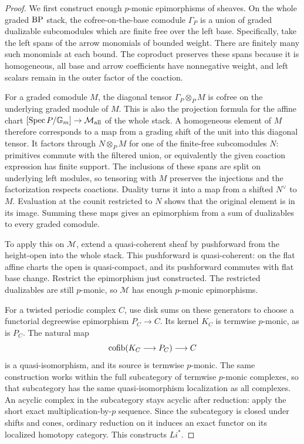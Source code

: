 \begin{proof}
We first construct enough $p$-monic epimorphisms of sheaves. On the
whole graded $\mathrm{BP}$ stack, the cofree-on-the-base comodule $\Gamma_P$
is a union of graded dualizable subcomodules which are finite free over
the left base. Specifically, take the left spans of the arrow monomials
of bounded weight. There are finitely many such monomials at each
bound. The coproduct preserves these spans because it is homogeneous,
all base and arrow coefficients have nonnegative weight, and left
scalars remain in the outer factor of the coaction.

For a graded comodule $M$, the diagonal tensor $\Gamma_P\otimes_PM$
is cofree on the underlying graded module of $M$. This is also the
projection formula for the affine chart
$[\operatorname{Spec} P/\mathbb G_m]\to\mathcal M_{\rm all}$ of the whole stack.
A homogeneous element of $M$ therefore corresponds to a map from a
grading shift of the unit into this diagonal tensor. It factors through
$N\otimes_PM$ for one of the finite-free subcomodules $N$:
primitives commute with the filtered union, or equivalently the given
coaction expression has finite support. The inclusions of these spans
are split on underlying left modules, so tensoring with $M$ preserves
the injections and the factorization respects coactions. Duality turns
it into a map from a shifted $N^\vee$ to $M$. Evaluation at the
counit restricted to $N$ shows that the original element is in its
image. Summing these maps gives an epimorphism from a sum of
dualizables to every graded comodule.

To apply this on $\mathcal M$, extend a quasi-coherent sheaf by
pushforward from the height-open into the whole stack. This
pushforward is quasi-coherent: on the flat affine charts the open is
quasi-compact, and its pushforward commutes with flat base change.
Restrict the epimorphism just constructed. The restricted dualizables
are still $p$-monic, so $\mathcal M$ has enough $p$-monic
epimorphisms.

For a twisted periodic complex $C$, use disk sums on these generators
to choose a functorial degreewise epimorphism $P_C\to C$. Its
kernel $K_C$ is termwise $p$-monic, as is $P_C$. The natural map
\[
 \operatorname{cofib}(K_C\longrightarrow P_C)\longrightarrow C
\]
is a quasi-isomorphism, and its source is termwise $p$-monic.
The same construction works within the full subcategory of termwise
$p$-monic complexes, so that subcategory has the same
quasi-isomorphism localization as all complexes. An acyclic complex
in the subcategory stays acyclic after reduction: apply the short
exact multiplication-by-$p$ sequence. Since the subcategory is
closed under shifts and cones, ordinary reduction on it induces an
exact functor on its localized homotopy category. This constructs
$Li^*$.


\end{proof}
